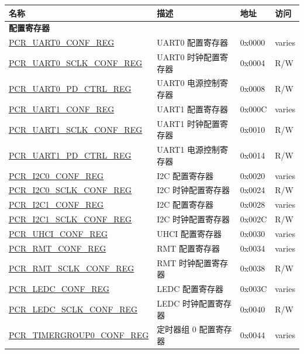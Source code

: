 \begin{longtable}{ | p{7.2cm} | p{6cm} | p{1.3cm} | p{1cm} | }
\hline\rowcolor{lightgray}
\textbf{名称} & \textbf{描述} &  \textbf{地址} & \textbf{访问} \\ \hline
\endhead
\multicolumn{4}{|l|}{\textbf{配置寄存器}} \\ \hline
\hyperref[regdesc:PCRUART0CONFREG]{PCR\_UART0\_CONF\_REG} & UART0 配置寄存器 & 0x0000 & varies \\ \hline
\hyperref[regdesc:PCRUART0SCLKCONFREG]{PCR\_UART0\_SCLK\_CONF\_REG} & UART0 时钟配置寄存器 & 0x0004 & R/W \\ \hline
\hyperref[regdesc:PCRUART0PDCTRLREG]{PCR\_UART0\_PD\_CTRL\_REG} & UART0 电源控制寄存器 & 0x0008 & R/W \\ \hline
\hyperref[regdesc:PCRUART1CONFREG]{PCR\_UART1\_CONF\_REG} & UART1 配置寄存器 & 0x000C & varies \\ \hline
\hyperref[regdesc:PCRUART1SCLKCONFREG]{PCR\_UART1\_SCLK\_CONF\_REG} & UART1 时钟配置寄存器 & 0x0010 & R/W \\ \hline
\hyperref[regdesc:PCRUART1PDCTRLREG]{PCR\_UART1\_PD\_CTRL\_REG} & UART1 电源控制寄存器 & 0x0014 & R/W \\ \hline
\hyperref[regdesc:PCRI2C0CONFREG]{PCR\_I2C0\_CONF\_REG} & I2C 配置寄存器 & 0x0020 & varies \\ \hline
\hyperref[regdesc:PCRI2C0SCLKCONFREG]{PCR\_I2C0\_SCLK\_CONF\_REG} & I2C 时钟配置寄存器 & 0x0024 & R/W \\ \hline
\hyperref[regdesc:PCRI2C1CONFREG]{PCR\_I2C1\_CONF\_REG} & I2C 配置寄存器 & 0x0028 & varies \\ \hline
\hyperref[regdesc:PCRI2C1SCLKCONFREG]{PCR\_I2C1\_SCLK\_CONF\_REG} & I2C 时钟配置寄存器 & 0x002C & R/W \\ \hline
\hyperref[regdesc:PCRUHCICONFREG]{PCR\_UHCI\_CONF\_REG} & UHCI 配置寄存器 & 0x0030 & varies \\ \hline
\hyperref[regdesc:PCRRMTCONFREG]{PCR\_RMT\_CONF\_REG} & RMT 配置寄存器 & 0x0034 & varies \\ \hline
\hyperref[regdesc:PCRRMTSCLKCONFREG]{PCR\_RMT\_SCLK\_CONF\_REG} & RMT 时钟配置寄存器 & 0x0038 & R/W \\ \hline
\hyperref[regdesc:PCRLEDCCONFREG]{PCR\_LEDC\_CONF\_REG} & LEDC 配置寄存器 & 0x003C & varies \\ \hline
\hyperref[regdesc:PCRLEDCSCLKCONFREG]{PCR\_LEDC\_SCLK\_CONF\_REG} & LEDC 时钟配置寄存器 & 0x0040 & R/W \\ \hline
\hyperref[regdesc:PCRTIMERGROUP0CONFREG]{PCR\_TIMERGROUP0\_CONF\_REG} & 定时器组 0 配置寄存器 & 0x0044 & varies \\ \hline

\end{longtable}
